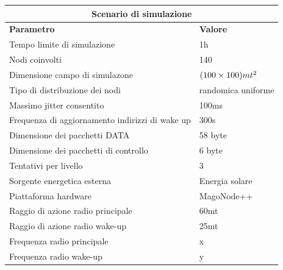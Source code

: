 \documentclass[binding=0.6cm,TFA]{sapthesis}
\begin{document}
\begin{table}[h]
    \setlength\doublerulesep{1mm} 
    \begin{tabular}{ |p{8cm}|p{4cm}|  }
        \hline
        \multicolumn{2}{|c|}{\textbf{Scenario di simulazione}}                                      \\
        \hline \hline
        \textbf{Parametro}                              & \textbf{Valore}                           \\
        \hline
        Tempo limite di simulazione                     & 1h                                        \\
        Nodi coinvolti                                  & 140                                       \\
        Dimensione campo di simulazone                  & $(100 \times 100) mt\textsuperscript{2}$  \\
        Tipo di distribuzione dei nodi                  & randomica uniforme                        \\
        Massimo jitter consentito                       & 100ms                                     \\
        Frequenza di aggiornamento indirizzi di wake up & 300s                                      \\
        Dimensione dei pacchetti DATA                   & 58 byte                                   \\
        Dimensione dei pacchetti di controllo           & 6 byte                                    \\
        Tentativi per livello                           & 3                                         \\
        Sorgente energetica esterna                     & Energia solare                            \\
        Piattaforma hardware                            & MagoNode++                                \\
        Raggio di azione radio principale               & 60mt                                      \\
        Raggio di azione radio wake-up                  & 25mt                                      \\
        Frequenza radio principale                      & x                                         \\
        Frequenza radio wake-up                         & y                                         \\

\end{tabular}
\end{table}
\end{document}
